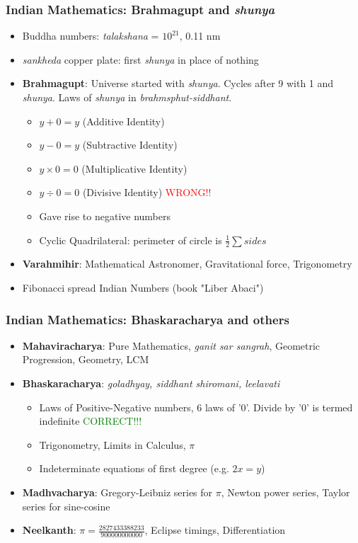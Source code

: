 \begin{frame}[fragile]
\frametitle{Indian Mathematics: Brahmagupt and {\it shunya}}
\begin{itemize}
\item Buddha numbers: {\it talakshana} = $10^{21}$, 0.11 nm
\item {\it sankheda} copper plate: first {\it shunya} in place of nothing
\item \textbf{Brahmagupt}: Universe started with {\it shunya}. Cycles after 9 with 1 and {\it shunya}. Laws of {\it shunya} in {\it brahmsphut-siddhant}. 
	\begin{itemize}
	\item $y + 0 = y$ (Additive Identity)
	\item $y - 0 = y$ (Subtractive Identity)
	\item $y \times 0 = 0$ (Multiplicative Identity)	
	\item $y \div 0 = 0$ (Divisive Identity) \textcolor{red}{WRONG!!}
	\item Gave rise to negative numbers
	\item Cyclic Quadrilateral: perimeter of circle is $\frac{1}{2}\sum{sides}$
	\end{itemize}
\item \textbf{Varahmihir}: Mathematical Astronomer, Gravitational force, Trigonometry
\item Fibonacci spread Indian Numbers (book "Liber Abaci")
\end{itemize}
\end{frame}

\begin{frame}[fragile]
\frametitle{Indian Mathematics: Bhaskaracharya and others}
\begin{itemize}
\item \textbf{Mahaviracharya}: Pure Mathematics, {\it ganit sar sangrah}, Geometric Progression, Geometry, LCM
\item \textbf{Bhaskaracharya}: {\it goladhyay, siddhant shiromani, leelavati}
	\begin{itemize}%
	\item Laws of Positive-Negative numbers, 6 laws of '0'. Divide by '0' is termed indefinite \textcolor{green}{CORRECT!!!}
	\item Trigonometry, Limits in Calculus, $\pi$
	\item Indeterminate equations of first degree (e.g. $2x = y$)
	\end{itemize}
\item \textbf{Madhvacharya}: Gregory-Leibniz series for $\pi$, Newton power series, Taylor series for sine-cosine
\item \textbf{Neelkanth}: $\pi = \frac{2827433388233}{900000000000}$, Eclipse timings, Differentiation
\end{itemize}
\end{frame}

